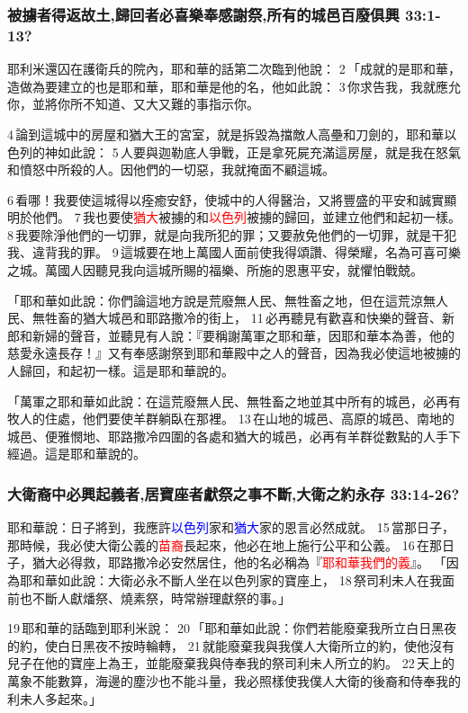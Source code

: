 \subsubsection{被擄者得返故土,歸回者必喜樂奉感謝祭,所有的城邑百廢俱興 33:1-13?}

耶利米還囚在護衛兵的院內，耶和華的話第二次臨到他說： 2 「成就的是耶和華，造做為要建立的也是耶和華，耶和華是他的名，他如此說： 3 你求告我，我就應允你，並將你所不知道、又大又難的事指示你。 


4 論到這城中的房屋和猶大王的宮室，就是拆毀為擋敵人高壘和刀劍的，耶和華以色列的神如此說： 5 人要與迦勒底人爭戰，正是拿死屍充滿這房屋，就是我在怒氣和憤怒中所殺的人。因他們的一切惡，我就掩面不顧這城。

 6 看哪！我要使這城得以痊癒安舒，使城中的人得醫治，又將豐盛的平安和誠實顯明於他們。 7 我也要使\textcolor{red}{猶大}被擄的和\textcolor{red}{以色列}被擄的歸回，並建立他們和起初一樣。 8 我要除淨他們的一切罪，就是向我所犯的罪；又要赦免他們的一切罪，就是干犯我、違背我的罪。 9 這城要在地上萬國人面前使我得頌讚、得榮耀，名為可喜可樂之城。萬國人因聽見我向這城所賜的福樂、所施的恩惠平安，就懼怕戰兢。

「耶和華如此說：你們論這地方說是荒廢無人民、無牲畜之地，但在這荒涼無人民、無牲畜的猶大城邑和耶路撒冷的街上， 11 必再聽見有歡喜和快樂的聲音、新郎和新婦的聲音，並聽見有人說：『要稱謝萬軍之耶和華，因耶和華本為善，他的慈愛永遠長存！』又有奉感謝祭到耶和華殿中之人的聲音，因為我必使這地被擄的人歸回，和起初一樣。這是耶和華說的。


「萬軍之耶和華如此說：在這荒廢無人民、無牲畜之地並其中所有的城邑，必再有牧人的住處，他們要使羊群躺臥在那裡。 13 在山地的城邑、高原的城邑、南地的城邑、便雅憫地、耶路撒冷四圍的各處和猶大的城邑，必再有羊群從數點的人手下經過。這是耶和華說的。

\subsubsection{大衛裔中必興起義者,居寶座者獻祭之事不斷,大衛之約永存 33:14-26?}
耶和華說：日子將到，我應許\textcolor{blue}{以色列}家和\textcolor{blue}{猶大}家的恩言必然成就。 15 當那日子，那時候，我必使大衛公義的\textcolor{red}{苗裔}長起來，他必在地上施行公平和公義。 16 在那日子，猶大必得救，耶路撒冷必安然居住，他的名必稱為『\textcolor{red}{耶和華我們的義}』。
「因為耶和華如此說：大衛必永不斷人坐在以色列家的寶座上， 18 祭司利未人在我面前也不斷人獻燔祭、燒素祭，時常辦理獻祭的事。」

19 耶和華的話臨到耶利米說： 20 「耶和華如此說：你們若能廢棄我所立白日黑夜的約，使白日黑夜不按時輪轉， 21 就能廢棄我與我僕人大衛所立的約，使他沒有兒子在他的寶座上為王，並能廢棄我與侍奉我的祭司利未人所立的約。 22 天上的萬象不能數算，海邊的塵沙也不能斗量，我必照樣使我僕人大衛的後裔和侍奉我的利未人多起來。」

